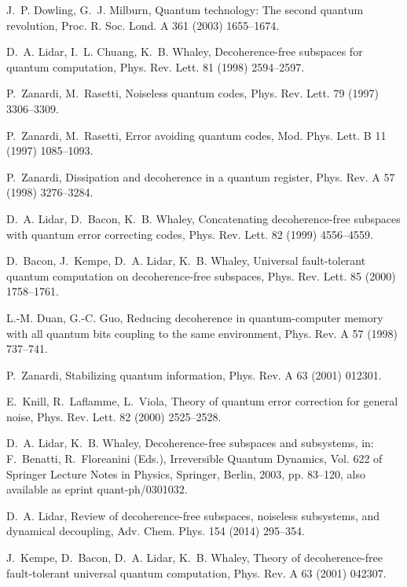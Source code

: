 \documentclass[3p,sort&compress,12pt]{elsarticle}
\begin{document}
\begin{thebibliography}{100}
J.~P. Dowling, G.~J. Milburn, Quantum technology: The second quantum
  revolution, Proc. R. Soc. Lond. A 361 (2003) 1655--1674.

D.~A. Lidar, I.~L. Chuang, K.~B. Whaley, Decoherence-free subspaces for quantum
  computation, Phys. Rev. Lett. 81 (1998) 2594--2597.

P.~Zanardi, M.~Rasetti, Noiseless quantum codes, Phys. Rev. Lett. 79 (1997)
  3306--3309.

P.~Zanardi, M.~Rasetti, Error avoiding quantum codes, Mod. Phys. Lett. B 11
  (1997) 1085--1093.

P.~Zanardi, Dissipation and decoherence in a quantum register, Phys. Rev. A 57
  (1998) 3276--3284.

D.~A. Lidar, D.~Bacon, K.~B. Whaley, Concatenating decoherence-free subspaces
  with quantum error correcting codes, Phys. Rev. Lett. 82 (1999) 4556--4559.

D.~Bacon, J.~Kempe, D.~A. Lidar, K.~B. Whaley, Universal fault-tolerant quantum
  computation on decoherence-free subspaces, Phys. Rev. Lett. 85 (2000)
  1758--1761.

L.-M. Duan, G.-C. Guo, Reducing decoherence in quantum-computer memory with all
  quantum bits coupling to the same environment, Phys. Rev. A 57 (1998)
  737--741.

P.~Zanardi, Stabilizing quantum information, Phys. Rev. A 63 (2001) 012301.

E.~Knill, R.~Laflamme, L.~Viola, Theory of quantum error correction for general
  noise, Phys. Rev. Lett. 82 (2000) 2525--2528.

D.~A. Lidar, K.~B. Whaley, Decoherence-free subspaces and subsystems, in:
  F.~Benatti, R.~Floreanini (Eds.), Irreversible Quantum Dynamics, Vol. 622 of
  Springer Lecture Notes in Physics, Springer, Berlin, 2003, pp. 83--120, also
  available as eprint quant-ph/0301032.

D.~A. Lidar, Review of decoherence-free subspaces, noiseless subsystems, and
  dynamical decoupling, Adv. Chem. Phys. 154 (2014) 295--354.

J.~Kempe, D.~Bacon, D.~A. Lidar, K.~B. Whaley, Theory of decoherence-free
  fault-tolerant universal quantum computation, Phys. Rev. A 63 (2001) 042307.


\end{thebibliography}
\end{document}

